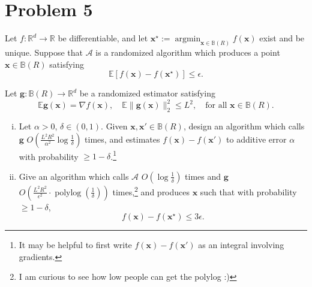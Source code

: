 \section*{Problem 5}

Let $f : \mathbb{R}^d \to \mathbb{R}$ be differentiable, and let $\mathbf{x}^\star := \operatorname{argmin}_{\mathbf{x} \in \mathbb{B}(R)} f(\mathbf{x})$ exist and be unique. Suppose that $\mathcal{A}$ is a randomized algorithm which produces a point $\mathbf{x} \in \mathbb{B}(R)$ satisfying
\[
\mathbb{E}\left[f(\mathbf{x}) - f(\mathbf{x}^\star)\right] \leq \epsilon.
\]

Let $\mathbf{g} : \mathbb{B}(R) \to \mathbb{R}^d$ be a randomized estimator satisfying
\[
\mathbb{E}\mathbf{g}(\mathbf{x}) = \nabla f(\mathbf{x}), \quad \mathbb{E}\|\mathbf{g}(\mathbf{x})\|_2^2 \leq L^2, \quad \text{for all } \mathbf{x} \in \mathbb{B}(R).
\]

\begin{enumerate}[(i)]
\item Let $\alpha > 0$, $\delta \in (0,1)$. Given $\mathbf{x}, \mathbf{x}' \in \mathbb{B}(R)$, design an algorithm which calls $\mathbf{g}$ $O\!\left(\frac{L^2 R^2}{\alpha^2} \log \frac{1}{\delta}\right)$ times, and estimates $f(\mathbf{x}) - f(\mathbf{x}')$ to additive error $\alpha$ with probability $\geq 1 - \delta$.\footnote{It may be helpful to first write $f(\mathbf{x}) - f(\mathbf{x}')$ as an integral involving gradients.}

\item Give an algorithm which calls $\mathcal{A}$ $O\!\left(\log \frac{1}{\delta}\right)$ times and $\mathbf{g}$ $O\!\left(\frac{L^2 R^2}{\epsilon^2} \cdot \operatorname{polylog}\!\left(\frac{1}{\delta}\right)\right)$ times,\footnote{I am curious to see how low people can get the polylog :)} and produces $\mathbf{x}$ such that with probability $\geq 1 - \delta$,
\[
f(\mathbf{x}) - f(\mathbf{x}^\star) \leq 3\epsilon.
\]
\end{enumerate}
